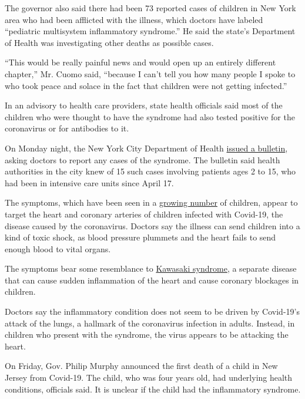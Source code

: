 The governor also said there had been 73 reported cases of children in
New York area who had been afflicted with the illness, which doctors
have labeled ``pediatric multisystem inflammatory syndrome.'' He said
the state's Department of Health was investigating other deaths as
possible cases.

``This would be really painful news and would open up an entirely
different chapter,'' Mr. Cuomo said, ``because I can't tell you how many
people I spoke to who took peace and solace in the fact that children
were not getting infected.''

In an advisory to health care providers, state health officials said
most of the children who were thought to have the syndrome had also
tested positive for the coronavirus or for antibodies to it.

On Monday night, the New York City Department of Health
\href{https://www1.nyc.gov/assets/doh/downloads/pdf/han/alert/2020/covid-19-pediatric-multi-system-inflammatory-syndrome.pdf}{issued
a bulletin}, asking doctors to report any cases of the syndrome. The
bulletin said health authorities in the city knew of 15 such cases
involving patients ages 2 to 15, who had been in intensive care units
since April 17.

The symptoms, which have been seen in a
\href{https://www.nytimes3xbfgragh.onion/2020/05/06/health/kawasaki-disease-covid-coronavirus-children.html}{growing
number} of children, appear to target the heart and coronary arteries of
children infected with Covid-19, the disease caused by the coronavirus.
Doctors say the illness can send children into a kind of toxic shock, as
blood pressure plummets and the heart fails to send enough blood to
vital organs.

The symptoms bear some resemblance to
\href{https://www.nytimes3xbfgragh.onion/2020/05/13/health/coronavirus-children-kawasaki-pmis.html}{Kawasaki
syndrome}, a separate disease that can cause sudden inflammation of the
heart and cause coronary blockages in children.

Doctors say the inflammatory condition does not seem to be driven by
Covid-19's attack of the lungs, a hallmark of the coronavirus infection
in adults. Instead, in children who present with the syndrome, the virus
appears to be attacking the heart.

On Friday, Gov. Philip Murphy announced the first death of a child in
New Jersey from Covid-19. The child, who was four years old, had
underlying health conditions, officials said. It is unclear if the child
had the inflammatory syndrome.

